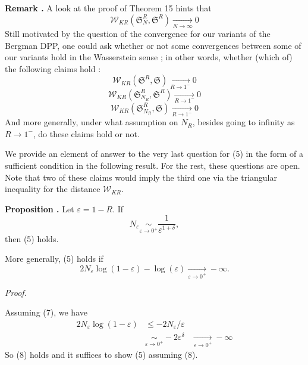\documentclass[11pt]{article}
\newcounter{cnt}
\newcommand{\cnt}{\thecnt \stepcounter{cnt}}
\begin{document}
\textbf{Remark \cnt.} A look at the proof of Theorem 15 hints that
\begin{equation}
\mathcal W_{KR} ( \mathfrak S^R_{N}, \mathfrak S^R ) \xrightarrow[N \to \infty]{} 0    
\end{equation}
Still motivated by the question of the convergence for our variants of the Bergman DPP, one could ask whether or not some convergences between some of our variants hold in the Wasserstein sense ; in other words, whether (which of) the following claims hold :
\begin{equation}
\mathcal W_{KR} ( \mathfrak S^R, \mathfrak S) \xrightarrow[R \to 1^-]{} 0
\end{equation}
\begin{equation}
\mathcal W_{KR} ( \mathfrak S^R_{N_R}, \mathfrak S^R ) \xrightarrow[R \to 1^-]{} 0
\end{equation}
\begin{equation}
\mathcal W_{KR} ( \mathfrak S^R_{N_R}, \mathfrak S ) \xrightarrow[R \to 1^-]{} 0
\end{equation}
And more generally, under what assumption on $ N_R $, besides going to infinity as $ R \to 1^- $, do these claims hold or not. 

We provide an element of answer to the very last question for (5) in the form of a sufficient condition in the following result. For the rest, these questions are open. Note that two of these claims would imply the third one via the triangular inequality for the distance $ \mathcal W_{KR} $.

\textbf{Proposition \cnt.} Let $ \varepsilon = 1 - R $. If 
\begin{equation}
N_\varepsilon \underset{\varepsilon \to 0^+}{\sim} \frac{1}{\varepsilon^{1+\delta}},
\end{equation}
then (5) holds.

More generally, (5) holds if 
\begin{equation}
2N_\varepsilon  \log(1-\varepsilon) - \log(\varepsilon) \xrightarrow[\varepsilon \to 0^+]{} - \infty .
\end{equation}

\textit{Proof.}

Assuming (7), we have
\begin{align*}
    2N_\varepsilon \log(1-\varepsilon) &\leqslant - 2N_\varepsilon / \varepsilon \\
                                       &\underset{\varepsilon \to 0^+}{\sim} - 2 \varepsilon^\delta
                                       &\xrightarrow[\varepsilon \to 0^+]{} - \infty 
\end{align*}
So (8) holds and it suffices to show (5) assuming (8).
\end{document}
